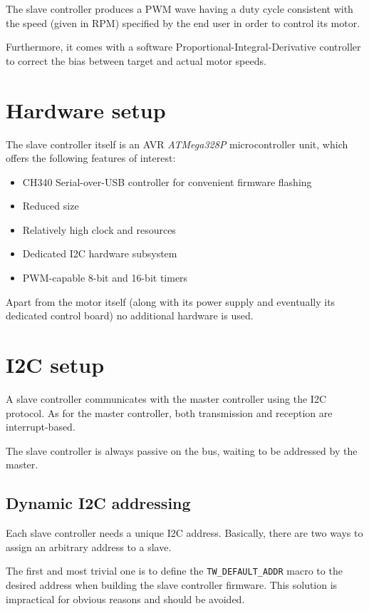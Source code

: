 \documentclass[binding=0.6cm,Lau]{sapthesis}
\begin{document}
The slave controller produces a PWM wave having a duty cycle consistent with
the speed (given in RPM) specified by the end user in order to control its
motor.

Furthermore, it comes with a software Proportional-Integral-Derivative
controller to correct the bias between target and actual motor speeds.

\section{Hardware setup}
The slave controller itself is an AVR \emph{ATMega328P} microcontroller
unit\cite{at328p-ref}, which offers the following features of interest:

\begin{itemize}
  \item CH340 Serial-over-USB controller for convenient firmware flashing
  \item Reduced size
  \item Relatively high clock and resources
  \item Dedicated I2C hardware subsystem
  \item PWM-capable 8-bit and 16-bit timers
\end{itemize}

Apart from the motor itself (along with its power supply and eventually its
dedicated control board) no additional hardware is used.

\section{I2C setup}
A slave controller communicates with the master controller using the I2C
protocol. As for the master controller, both transmission and reception are
interrupt-based.

The slave controller is always passive on the bus, waiting to be addressed by
the master.

\subsection{Dynamic I2C addressing}
Each slave controller needs a unique I2C address. Basically, there are two ways
to assign an arbitrary address to a slave.

The first and most trivial one is to define the \texttt{TW\_DEFAULT\_ADDR}
macro to the desired address when building the slave controller firmware. This
solution is impractical for obvious reasons and should be avoided.
\end{document}
